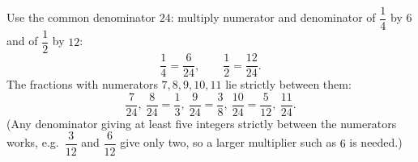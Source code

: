 Use the common denominator $24$: multiply numerator and denominator of $\dfrac{1}{4}$ by $6$ and of $\dfrac{1}{2}$ by $12$:
\[
\dfrac{1}{4}=\dfrac{6}{24},\qquad\dfrac{1}{2}=\dfrac{12}{24}.
\]
The fractions with numerators $7,8,9,10,11$ lie strictly between them:
\[
\boxed{\dfrac{7}{24},\ \dfrac{8}{24}=\dfrac{1}{3},\ \dfrac{9}{24}=\dfrac{3}{8},\ \dfrac{10}{24}=\dfrac{5}{12},\ \dfrac{11}{24}}.
\]
(Any denominator giving at least five integers strictly between the numerators works, e.g.\ $\dfrac{3}{12}$ and $\dfrac{6}{12}$ give only two, so a larger multiplier such as $6$ is needed.)
